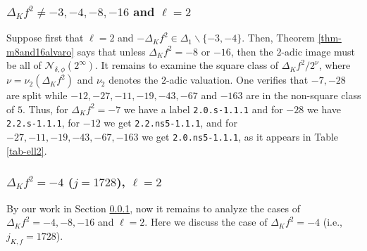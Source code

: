 \documentclass[11pt]{amsart}
\theoremstyle{definition}
\begin{document}
\subsubsection{$\Delta_K f^2 \neq -3,-4,-8,-16$ and $\ell =2$}\label{sec-not34816ell2} Suppose first that $\ell=2$ and $-\Delta_K f^2\in \Delta_1\smallsetminus\{-3,-4\}$. Then, Theorem \ref{thm-m8and16alvaro} says that unless $\Delta_K f^2 = -8$ or $-16$, then the $2$-adic image must be all of $\mathcal{N}_{\delta,\phi}(2^\infty)$. It remains to examine the square class of $\Delta_K f^2/2^\nu$, where $\nu=\nu_2(\Delta_K f^2)$ and $\nu_2$ denotes the $2$-adic valuation. One verifies that $-7,-28$ are split while $-12,-27,-11,-19,-43,-67$ and $-163$ are in the non-square class of $5$. Thus, for $\Delta_K f^2=-7$ we have a label \texttt{2.0.s-1.1.1} and for $-28$ we have \texttt{2.2.s-1.1.1}, for $-12$ we get \texttt{2.2.ns5-1.1.1}, and for $-27,-11,-19,-43,-67,-163$ we get \texttt{2.0.ns5-1.1.1}, as it appears in Table \ref{tab-ell2}.

\subsubsection{$\Delta_Kf^2=-4$ ($j = 1728$), $\ell = 2$}\label{sec-4ell2} By our work in Section \ref{sec-not34816ell2}, now it remains to analyze the cases of $\Delta_K f^2 = -4,-8,-16$ and $\ell=2$. Here we discuss the case of $\Delta_K f^2=-4$ (i.e., $j_{K,f}=1728$).
\end{document}
